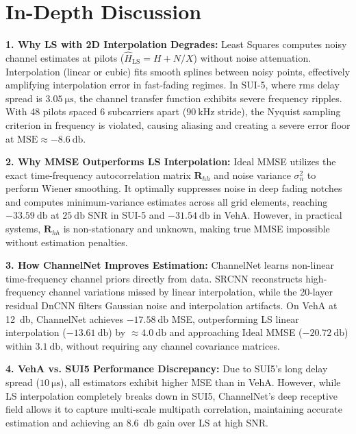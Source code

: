 \documentclass[10pt,a4paper]{article}
\begin{document}
\section{In-Depth Discussion}
\label{sec:discussion}
\textbf{1. Why LS with 2D Interpolation Degrades:} Least Squares computes noisy channel estimates at pilots ($\hat{H}_{\text{LS}} = H + N/X$) without noise attenuation. Interpolation (linear or cubic) fits smooth splines between noisy points, effectively amplifying interpolation error in fast-fading regimes. In SUI-5, where rms delay spread is $\SI{3.05}{\micro\second}$, the channel transfer function exhibits severe frequency ripples. With 48 pilots spaced 6 subcarriers apart ($\SI{90}{\kilo\hertz}$ stride), the Nyquist sampling criterion in frequency is violated, causing aliasing and creating a severe error floor at $\text{MSE} \approx -\SI{8.6}{\decibel}$.

\textbf{2. Why MMSE Outperforms LS Interpolation:} Ideal MMSE utilizes the exact time-frequency autocorrelation matrix $\mathbf{R}_{hh}$ and noise variance $\sigma_n^2$ to perform Wiener smoothing. It optimally suppresses noise in deep fading notches and computes minimum-variance estimates across all grid elements, reaching $-\SI{33.59}{\decibel}$ at $\SI{25}{\decibel}$ SNR in SUI-5 and $-\SI{31.54}{\decibel}$ in VehA. However, in practical systems, $\mathbf{R}_{hh}$ is non-stationary and unknown, making true MMSE impossible without estimation penalties.

\textbf{3. How ChannelNet Improves Estimation:} ChannelNet learns non-linear time-frequency channel priors directly from data. SRCNN reconstructs high-frequency channel variations missed by linear interpolation, while the 20-layer residual DnCNN filters Gaussian noise and interpolation artifacts. On VehA at \SI{12}{\decibel}, ChannelNet achieves $-\SI{17.58}{\decibel}$ MSE, outperforming LS linear interpolation ($-\SI{13.61}{\decibel}$) by $\approx \SI{4.0}{\decibel}$ and approaching Ideal MMSE ($-\SI{20.72}{\decibel}$) within $\SI{3.1}{\decibel}$, without requiring any channel covariance matrices.

\textbf{4. VehA vs. SUI5 Performance Discrepancy:} Due to SUI5's long delay spread ($\SI{10}{\micro\second}$), all estimators exhibit higher MSE than in VehA. However, while LS interpolation completely breaks down in SUI5, ChannelNet's deep receptive field allows it to capture multi-scale multipath correlation, maintaining accurate estimation and achieving an \SI{8.6}{\decibel} gain over LS at high SNR.
\end{document}
